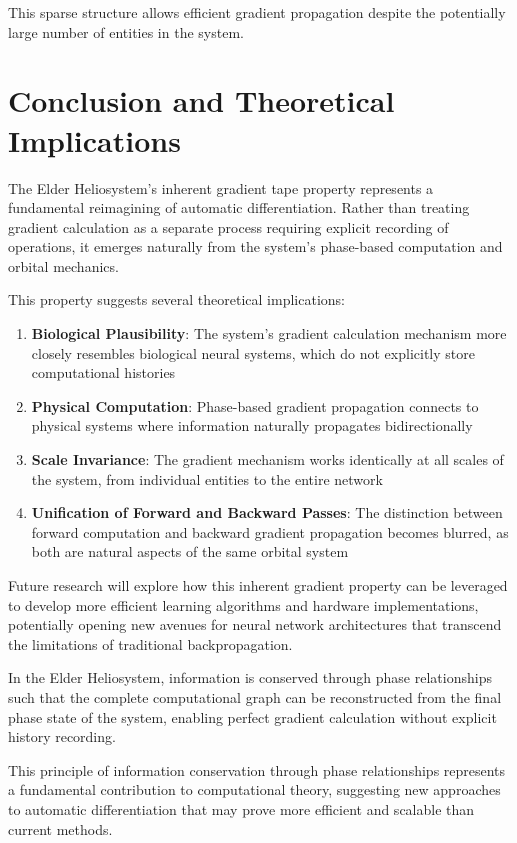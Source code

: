 This sparse structure allows efficient gradient propagation despite the potentially large number of entities in the system.

\section{Conclusion and Theoretical Implications}

The Elder Heliosystem's inherent gradient tape property represents a fundamental reimagining of automatic differentiation. Rather than treating gradient calculation as a separate process requiring explicit recording of operations, it emerges naturally from the system's phase-based computation and orbital mechanics.

This property suggests several theoretical implications:

\begin{enumerate}
    \item \textbf{Biological Plausibility}: The system's gradient calculation mechanism more closely resembles biological neural systems, which do not explicitly store computational histories
    \item \textbf{Physical Computation}: Phase-based gradient propagation connects to physical systems where information naturally propagates bidirectionally
    \item \textbf{Scale Invariance}: The gradient mechanism works identically at all scales of the system, from individual entities to the entire network
    \item \textbf{Unification of Forward and Backward Passes}: The distinction between forward computation and backward gradient propagation becomes blurred, as both are natural aspects of the same orbital system
\end{enumerate}

Future research will explore how this inherent gradient property can be leveraged to develop more efficient learning algorithms and hardware implementations, potentially opening new avenues for neural network architectures that transcend the limitations of traditional backpropagation.

\begin{theorem}
In the Elder Heliosystem, information is conserved through phase relationships such that the complete computational graph can be reconstructed from the final phase state of the system, enabling perfect gradient calculation without explicit history recording.
\end{theorem}

This principle of information conservation through phase relationships represents a fundamental contribution to computational theory, suggesting new approaches to automatic differentiation that may prove more efficient and scalable than current methods.